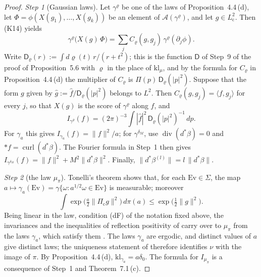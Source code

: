 \documentclass[11pt]{amsart}
\theoremstyle{definition}
\begin{document}
\begin{proof}
\emph{Step 1} (Gaussian laws).
Let $\gamma^\varrho$ be one of the laws of Proposition~4.4\,(d), let $\Phi=\phi(X(g_1),\dots,X(g_k))$ be an element of $\mathcal A(\gamma^\varrho)$, and let $g\in L^2_{\mathrm c}$.
Then (K14) yields
\begin{equation*}
\gamma^\varrho\bigl(X(g)\,\Phi\bigr)=\sum_jC_\varrho(g,g_j)\,\gamma^\varrho(\partial_j\phi).
\end{equation*}
Write $\mathsf D_\varrho(r):=\int d\varrho(t)\,r/(r+t^2)$;
this is the function $\mathsf D$ of Step~9 of the proof of Proposition~5.6 with $\varrho$ in the place of $\mathrm{kl}_\mu$,
and by the formula for $C_\varrho$ in Proposition~4.4\,(d) the multiplier of $C_\varrho$ is $\Pi(p)\,\mathsf D_\varrho(|p|^2)$.
Suppose that the form $g$ given by $\hat g:=\hat f/\mathsf D_\varrho(|p|^2)$ belongs to $L^2$.
Then $C_\varrho(g,g_j)=\langle f,g_j\rangle$ for every $j$,
so that $X(g)$ is the score of $\gamma^\varrho$ along $f$, and
\begin{equation*}
I_{\gamma^\varrho}(f)=(2\pi)^{-3}\int|\hat f|^2\,\mathsf D_\varrho(|p|^2)^{-1}\,dp.
\end{equation*}
For $\gamma_a$ this gives $I_{\gamma_a}(f)=\|f\|^2/a$;
for $\gamma^{\delta_M}$, use $\operatorname{div}(d^*\beta)=0$ and $\ast f=\operatorname{curl}(d^*\beta)$.
The Fourier formula in Step~1 then gives $I_{\gamma^{\delta_M}}(f)=\|f\|^2+M^2\|d^*\beta\|^2$.
Finally, $\|d^*\beta^{(l)}\|=l\,\|d^*\beta\|$.

\emph{Step 2} (the law $\mu_\pi$).
Tonelli's theorem shows that, for each $\mathrm{Ev}\in\Sigma$, the map $a\mapsto\gamma_a(\mathrm{Ev})=\allowbreak \gamma\{\omega:a^{1/2}\omega\in\mathrm{Ev}\}$ is measurable;
moreover
\begin{equation*}
\int\exp\bigl(\tfrac a2\|\Pi_{\mathrm c}g\|^2\bigr)\,d\pi(a)\le\exp\bigl(\tfrac12\|g\|^2\bigr).
\end{equation*}
Being linear in the law, condition (dF) of the notation fixed above, the invariances and the inequalities of reflection positivity of \cite[(n3)]{QEDIII} carry over to $\mu_\pi$ from the laws $\gamma_a$, which satisfy them \cite[Lemma~12.29]{QEDII}.
The laws $\gamma_a$ are ergodic,
and distinct values of $a$ give distinct laws;
the uniqueness statement of \cite[Proposition~45.6\,(a$''$)]{QEDIII} therefore identifies $\nu$ with the image of $\pi$.
By Proposition~4.4\,(d), $\mathrm{kl}_{\gamma_a}=a\delta_0$.
The formula for $I_{\mu_\pi}$ is a consequence of Step~1 and Theorem~7.1\,(c).


\end{proof}
\end{document}
